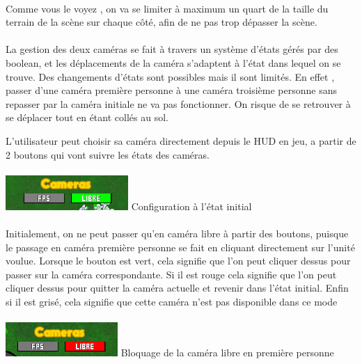 \documentclass{report}
\begin{document}
\paragraph{}
Comme vous le voyez , on va se limiter à maximum un quart de la taille du terrain de la scène sur chaque côté, afin de ne pas trop dépasser la scène.
\paragraph{}
La gestion des deux caméras se fait à travers un système d’états gérés par des boolean, et les déplacements de la caméra s’adaptent à l’état dans lequel on se trouve.
Des changements d’états sont possibles mais il sont limités. En effet , passer d’une caméra première personne à une caméra troisième personne sans repasser par la caméra initiale ne va pas fonctionner.  On risque de se retrouver à se déplacer tout en étant collés au sol.

L’utilisateur peut choisir sa caméra directement depuis le HUD en jeu,  a partir de 2 boutons qui vont suivre les états des caméras.

\paragraph{}
\begin{center}
\includegraphics[scale=1]{DATA/cem.png}
 {Configuration à l’état initial}
\end{center}
\paragraph{}

Initialement, on ne peut passer qu’en caméra libre à partir des boutons, puisque le passage en caméra première personne se fait en cliquant directement sur l’unité voulue. 
Lorsque le bouton est vert, cela signifie que l’on peut cliquer dessus pour passer sur la caméra correspondante. Si il est rouge cela signifie que l’on peut cliquer dessus pour quitter la caméra actuelle et revenir dans l’état initial. 
Enfin si il est grisé, cela signifie que cette caméra n’est pas disponible dans ce mode

\paragraph{}
\begin{center}
\includegraphics[scale=1]{DATA/Sanstitre3.png}
 {Bloquage de la caméra libre en première personne}
\end{center}
\end{document}
